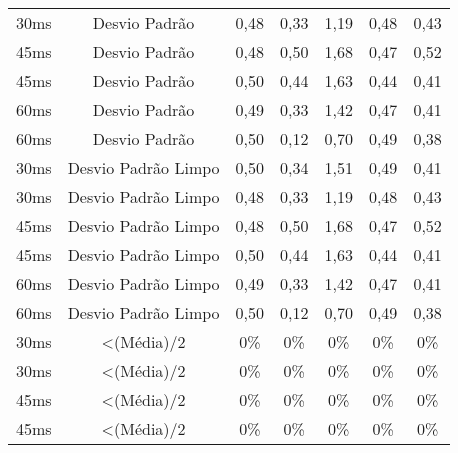 \begin{table}[]
\begin{tabular}{|c|c|ccccc|}
30ms              & Desvio Padrão       & 0,48              & 0,33              & 1,19              & 0,48              & 0,43              \\
45ms              & Desvio Padrão       & 0,48              & 0,50              & 1,68              & 0,47              & 0,52              \\
45ms              & Desvio Padrão       & 0,50              & 0,44              & 1,63              & 0,44              & 0,41              \\
60ms              & Desvio Padrão       & 0,49              & 0,33              & 1,42              & 0,47              & 0,41              \\
60ms              & Desvio Padrão       & 0,50              & 0,12              & 0,70              & 0,49              & 0,38              \\ \hline
30ms              & Desvio Padrão Limpo & 0,50              & 0,34              & 1,51              & 0,49              & 0,41              \\
30ms              & Desvio Padrão Limpo & 0,48              & 0,33              & 1,19              & 0,48              & 0,43              \\
45ms              & Desvio Padrão Limpo & 0,48              & 0,50              & 1,68              & 0,47              & 0,52              \\
45ms              & Desvio Padrão Limpo & 0,50              & 0,44              & 1,63              & 0,44              & 0,41              \\
60ms              & Desvio Padrão Limpo & 0,49              & 0,33              & 1,42              & 0,47              & 0,41              \\
60ms              & Desvio Padrão Limpo & 0,50              & 0,12              & 0,70              & 0,49              & 0,38              \\ \hline
30ms              & \textless (Média)/2 & 0\%            & 0\%            & 0\%            & 0\%            & 0\%            \\
30ms              & \textless (Média)/2 & 0\%            & 0\%            & 0\%            & 0\%            & 0\%            \\
45ms              & \textless (Média)/2 & 0\%            & 0\%            & 0\%            & 0\%            & 0\%            \\
45ms              & \textless (Média)/2 & 0\%            & 0\%            & 0\%            & 0\%            & 0\%            \\

\end{tabular}
\end{table}
